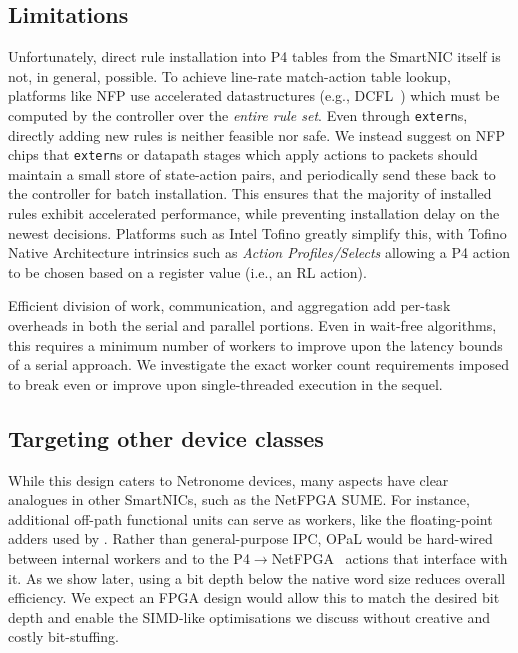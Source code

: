 \documentclass[
sigconf,natbib=false
]{acmart}
\newcommand{\approachshort}{OPaL}
\begin{document}
\subsection{Limitations}\label{sec:limitations}
Unfortunately, direct rule installation into P4 tables from the SmartNIC itself is not, in general, possible.
To achieve line-rate match-action table lookup, platforms like NFP use accelerated datastructures (e.g., DCFL~\parencite{DBLP:conf/infocom/TaylorT05}) which must be computed by the controller over the \emph{entire rule set}.
Even through \texttt{extern}s, directly adding new rules is neither feasible nor safe.
We instead suggest on NFP chips that \texttt{extern}s or datapath stages which apply actions to packets should maintain a small store of state-action pairs, and periodically send these back to the controller for batch installation.
This ensures that the majority of installed rules exhibit accelerated performance, while preventing installation delay on the newest decisions.
Platforms such as Intel Tofino greatly simplify this, with Tofino Native Architecture intrinsics such as \emph{Action Profiles/Selects} allowing a P4 action to be chosen based on a register value (i.e., an RL action).

Efficient division of work, communication, and aggregation add per-task overheads in both the serial and parallel portions.
Even in wait-free algorithms, this requires a minimum number of workers to improve upon the latency bounds of a serial approach.
We investigate the exact worker count requirements imposed to break even or improve upon single-threaded execution in the sequel.

\subsection{Targeting other device classes}
While this design caters to Netronome devices, many aspects have clear analogues in other SmartNICs, such as the NetFPGA SUME.
For instance, additional off-path functional units can serve as workers, like the floating-point adders used by \textcite{DBLP:conf/isca/LiLYCSH19}.
Rather than general-purpose IPC, \approachshort{} would be hard-wired between internal workers and to the P4$\rightarrow$NetFPGA~\parencite{DBLP:conf/fpga/IbanezBMZ19} actions that interface with it.
As we show later, using a bit depth below the native word size reduces overall efficiency.
We expect an FPGA design would allow this to match the desired bit depth and enable the SIMD-like optimisations we discuss without creative and costly bit-stuffing.
\end{document}
